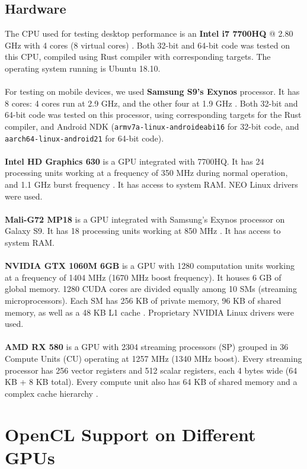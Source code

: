 \subsection{Hardware}
The CPU used for testing desktop performance is an \textbf{Intel i7 7700HQ} @ 2.80 GHz with 4 cores (8 virtual cores) \cite{intel7700hq}. Both 32-bit and 64-bit code was tested on this CPU, compiled using Rust compiler with corresponding targets. The operating system running is Ubuntu 18.10.\\
\\
For testing on mobile devices, we used \textbf{Samsung S9's Exynos} processor. It has 8 cores: 4 cores run at 2.9 GHz, and the other four at 1.9 GHz \cite{exynos9810}. Both 32-bit and 64-bit code was tested on this processor, using corresponding targets for the Rust compiler, and Android NDK (\texttt{armv7a-linux-androideabi16} for 32-bit code, and \texttt{aarch64-linux-android21} for 64-bit code).\\
\\
\textbf{Intel HD Graphics 630} is a GPU integrated with 7700HQ. It has 24 processing units working at a frequency of 350 MHz during normal operation, and 1.1 GHz burst frequency \cite{intelhd630}. It has access to system RAM. NEO Linux drivers were used.\\
\\
\textbf{Mali-G72 MP18} is a GPU integrated with Samsung's Exynos processor on Galaxy S9. It has 18 processing units working at 850 MHz \cite{mali}. It has access to system RAM.\\
\\
\textbf{NVIDIA GTX 1060M 6GB} is a GPU with 1280 computation units working at a frequency of 1404 MHz (1670 MHz boost frequency). It houses 6 GB of global memory. 1280 CUDA cores are divided equally among 10 SMs (streaming microprocessors). Each SM has 256 KB of private memory, 96 KB of shared memory, as well as a 48 KB L1 cache \cite{nvidia1060}. Proprietary NVIDIA Linux drivers were used.\\
\\
\textbf{AMD RX 580} is a GPU with 2304 streaming processors (SP) grouped in 36 Compute Units (CU) operating at 1257 MHz (1340 MHz boost). Every streaming processor has 256 vector registers and 512 scalar registers, each 4 bytes wide (64 KB + 8 KB total). Every compute unit also has 64 KB of shared memory and a complex cache hierarchy \cite{amdrx580}.\\

\section{OpenCL Support on Different GPUs}

